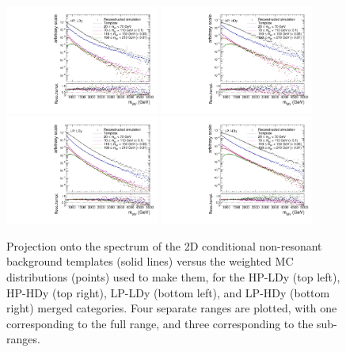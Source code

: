 \begin{figure}[htbp]
  \centering
  \includegraphics[width=0.45\textwidth]{fig/analysis/templateVsReco_nonResCond_MVV_e_HP_nobb_LDy.pdf}
  \includegraphics[width=0.45\textwidth]{fig/analysis/templateVsReco_nonResCond_MVV_e_HP_nobb_HDy.pdf}\\
  \includegraphics[width=0.45\textwidth]{fig/analysis/templateVsReco_nonResCond_MVV_e_LP_nobb_LDy.pdf}
  \includegraphics[width=0.45\textwidth]{fig/analysis/templateVsReco_nonResCond_MVV_e_LP_nobb_HDy.pdf}\\
  \caption{
    Projection onto the \MVV spectrum of the 2D conditional non-resonant background templates (solid lines) versus the weighted MC distributions (points) used to make them, for the HP-LDy (top left), HP-HDy (top right), LP-LDy (bottom left), and LP-HDy (bottom right) merged categories.
    Four separate \MJ ranges are plotted, with one corresponding to the full \MJ range, and three corresponding to the sub-ranges.
  }
  \label{fig:condTemplateVscondReco_nonRes_MVV_Run2}
\end{figure}

